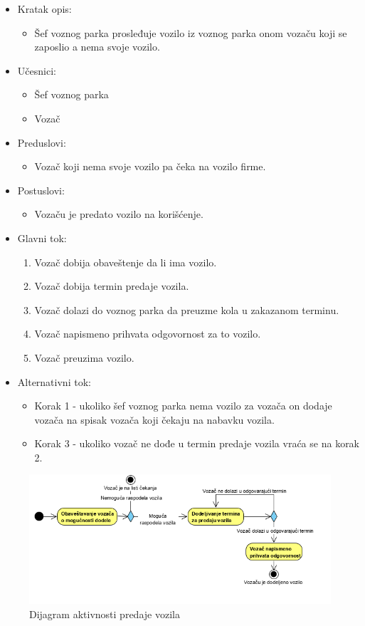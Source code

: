 \begin{itemize}
	\item Kratak opis:
		\begin{itemize}
			\item Šef voznog parka prosleđuje vozilo iz voznog parka onom vozaču koji se zaposlio a nema svoje vozilo.
		\end{itemize}
	\item Učesnici:
		\begin{itemize}
		    \item Šef voznog parka
			\item Vozač
		\end{itemize}
	\item Preduslovi:
		\begin{itemize}
		    \item Vozač koji nema svoje vozilo pa čeka na vozilo firme.
		\end{itemize}
	\item Postuslovi:
		\begin{itemize}
			\item Vozaču je predato vozilo na korišćenje.
	\end{itemize}
	\item Glavni tok:
		\begin{enumerate}
		    \item Vozač dobija obaveštenje da li ima vozilo.
		    \item Vozač dobija termin predaje vozila.
		    \item Vozač dolazi do voznog parka da preuzme kola u zakazanom terminu.
			\item Vozač napismeno prihvata odgovornost za to vozilo.
			\item Vozač preuzima vozilo.
		\end{enumerate}
	\item Alternativni tok:
		\begin{itemize}
		    \item Korak 1 - ukoliko šef voznog parka nema vozilo za vozača on dodaje vozača na spisak vozača koji čekaju na nabavku vozila.
		    \item Korak 3 - ukoliko vozač ne dođe u termin predaje vozila vraća se na korak 2.
		\end{itemize}
\end{itemize}

\begin{figure}[H]
\begin{center}
\includegraphics[scale=1]{Slike/PredajaVozila.png}
\end{center}
    \caption{Dijagram aktivnosti predaje vozila}
\label{fig:PredajaVozila}
\end{figure}

